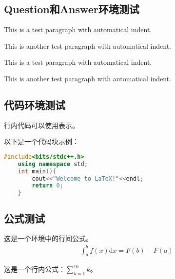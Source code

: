 \documentclass{article}
\begin{document}
\subsection{Question和Answer环境测试}
\begin{Question}
    
This is a test paragraph with automatical indent.

This is another test paragraph with automatical indent.

\end{Question}
\begin{Answer}
    This is a test paragraph with automatical indent.
    
    This is another test paragraph with automatical indent.
\end{Answer}
\subsection{代码环境测试}
行内代码可以使用\code{\\code{}}表示。

以下是一个代码块示例：
\begin{lstlisting}[language=C++]
    #include<bits/stdc++.h>
    using namespace std;
    int main(){
        cout<<"Welcome to LaTeX!"<<endl;
        return 0;
    }
\end{lstlisting}
\subsection{公式测试}
这是一个环境中的行间公式。
\begin{align}
    \int_a^bf(x)\mathrm{d}x=F(b)-F(a)
\end{align}

这是一个行内公式：$\sum_{k=1}^{10}k$。
\end{document}
